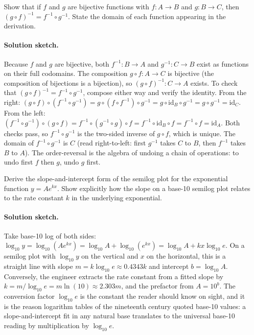 \begin{exercise}
Show that if $f$ and $g$ are bijective functions with $f: A \to B$
and $g: B \to C$, then $(g \circ f)^{-1} = f^{-1} \circ g^{-1}$.
State the domain of each function appearing in the derivation.

\paragraph{Solution sketch.}
Because $f$ and $g$ are bijective, both $f^{-1}: B \to A$ and
$g^{-1}: C \to B$ exist as functions on their full codomains. The
composition $g \circ f: A \to C$ is bijective (the composition of
bijections is a bijection), so $(g \circ f)^{-1}: C \to A$ exists.
To check that $(g \circ f)^{-1} = f^{-1} \circ g^{-1}$, compose
either way and verify the identity. From the right:
$(g \circ f) \circ (f^{-1} \circ g^{-1}) = g \circ (f \circ
f^{-1}) \circ g^{-1} = g \circ \mathrm{id}_{B} \circ g^{-1} =
g \circ g^{-1} = \mathrm{id}_{C}$. From the left:
$(f^{-1} \circ g^{-1}) \circ (g \circ f) = f^{-1} \circ (g^{-1}
\circ g) \circ f = f^{-1} \circ \mathrm{id}_{B} \circ f =
f^{-1} \circ f = \mathrm{id}_{A}$. Both checks pass, so
$f^{-1} \circ g^{-1}$ is the two-sided inverse of $g \circ f$,
which is unique. The domain of $f^{-1} \circ g^{-1}$ is $C$
(read right-to-left: first $g^{-1}$ takes $C$ to $B$, then $f^{-1}$
takes $B$ to $A$). The order-reversal is the algebra of undoing a
chain of operations: to undo first $f$ then $g$, undo $g$ first.
\end{exercise}

\begin{exercise}
Derive the slope-and-intercept form of the semilog plot for the
exponential function $y = A e^{kx}$. Show explicitly how the slope
on a base-10 semilog plot relates to the rate constant $k$ in the
underlying exponential.

\paragraph{Solution sketch.}
Take base-10 log of both sides: $\log_{10} y = \log_{10}(A e^{kx})
= \log_{10} A + \log_{10}(e^{kx}) = \log_{10} A + kx \log_{10} e$.
On a semilog plot with $\log_{10} y$ on the vertical and $x$ on
the horizontal, this is a straight line with slope $m = k
\log_{10} e \approx 0.4343 k$ and intercept $b = \log_{10} A$.
Conversely, the engineer extracts the rate constant from a fitted
slope by $k = m / \log_{10} e = m \ln(10) \approx 2.303 m$, and
the prefactor from $A = 10^{b}$. The conversion factor $\log_{10}
e$ is the constant the reader should know on sight, and it is the
reason logarithm tables of the nineteenth century quoted base-10
values: a slope-and-intercept fit in any natural base translates
to the universal base-10 reading by multiplication by $\log_{10}
e$.
\end{exercise}


